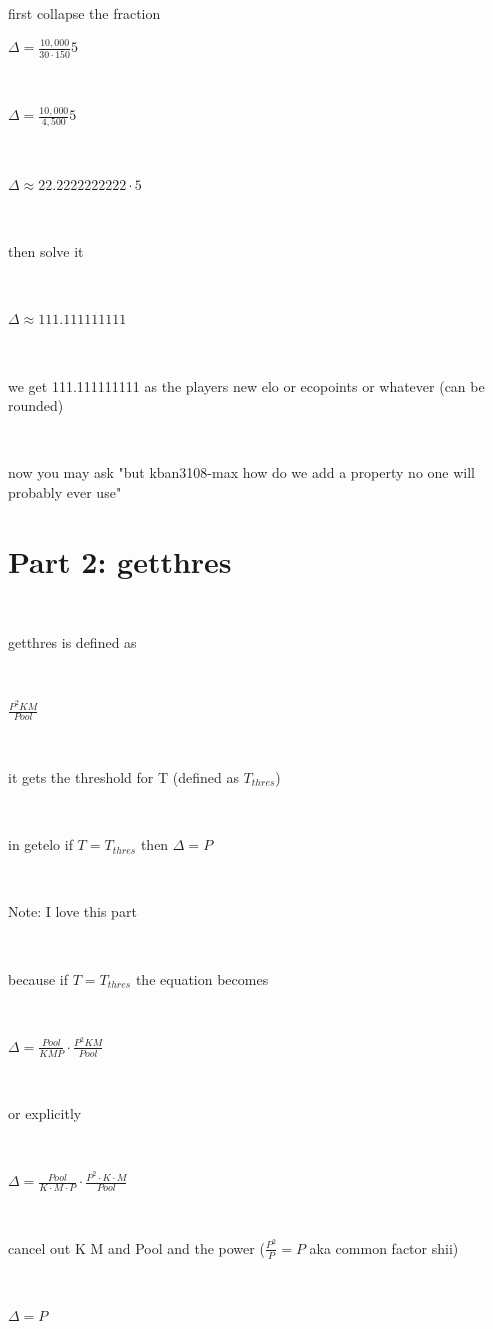 \documentclass{article}
\begin{document}
\ 

first collapse the fraction

$\Delta = \frac{10,000}{30 \cdot 150} 5$

\ 

$\Delta = \frac{10,000}{4,500} 5$

\ 

$\Delta \approx 22.2222222222 \cdot 5$

\ 

then solve it

\ 

$\Delta \approx 111.111111111$

\ 

we get 111.111111111 as the players new elo or ecopoints or whatever (can be rounded)

\ 

now you may ask "but kban3108-max how do we add a property no one will probably ever use"

\section{Part 2: getthres}

$ $

getthres is defined as

\ 

$\frac{{P^2}KM}{Pool}$

\ 

it gets the threshold for T (defined as $T_{thres}$)

\ 

in getelo if $T = T_{thres}$ then $\Delta = P$ 

\ 

\colorbox{black!25}{Note: I love this part}

\ 

because if $T = T_{thres}$ the equation becomes

\ 

$\Delta = \frac{Pool}{KMP} \cdot \frac{{P^2}KM}{Pool}$

\ 

or explicitly 

\ 

$\Delta = \frac{Pool}{K \cdot M \cdot P} \cdot \frac{{P^2}\cdot K \cdot M}{Pool}$

\ 

cancel out K M and Pool and the power ($\frac{P^2}{P} = P$ aka common factor shii) 

\ 

$\Delta = P$
\end{document}
